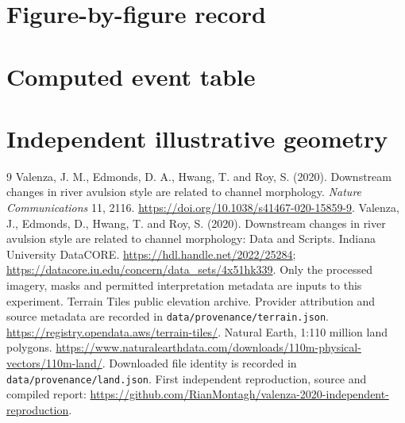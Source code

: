 \documentclass[11pt]{article}
\begin{document}
\appendix
\section{Figure-by-figure record}
\section{Computed event table}
\section{Independent illustrative geometry}

\begin{thebibliography}{9}
 Valenza, J. M., Edmonds, D. A., Hwang, T. and Roy, S. (2020).
Downstream changes in river avulsion style are related to channel morphology.
\emph{Nature Communications} 11, 2116.
\url{https://doi.org/10.1038/s41467-020-15859-9}.
 Valenza, J., Edmonds, D., Hwang, T. and Roy, S. (2020).
Downstream changes in river avulsion style are related to channel morphology:
Data and Scripts. Indiana University DataCORE.
\url{https://hdl.handle.net/2022/25284};
\url{https://datacore.iu.edu/concern/data_sets/4x51hk339}.
Only the processed imagery, masks and permitted interpretation metadata
are inputs to this experiment.
 Terrain Tiles public elevation archive. Provider
attribution and source metadata are recorded in
\texttt{data/provenance/terrain.json}.
\url{https://registry.opendata.aws/terrain-tiles/}.
 Natural Earth, 1:110 million land polygons.
\url{https://www.naturalearthdata.com/downloads/110m-physical-vectors/110m-land/}.
Downloaded file identity is recorded in \texttt{data/provenance/land.json}.
 First independent reproduction, source and compiled report:
\url{https://github.com/RianMontagh/valenza-2020-independent-reproduction}.
\end{thebibliography}
\end{document}
